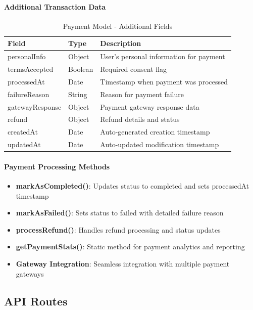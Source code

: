 \documentclass[12pt,a4paper]{article}
\begin{document}
\paragraph{Additional Transaction Data}
\begin{table}[H]
\centering
\small
\begin{tabular}{@{}lll@{}}
\toprule
\textbf{Field} & \textbf{Type} & \textbf{Description} \\
\midrule
personalInfo & Object & User's personal information for payment \\
termsAccepted & Boolean & Required consent flag \\
processedAt & Date & Timestamp when payment was processed \\
failureReason & String & Reason for payment failure \\
gatewayResponse & Object & Payment gateway response data \\
refund & Object & Refund details and status \\
createdAt & Date & Auto-generated creation timestamp \\
updatedAt & Date & Auto-updated modification timestamp \\
\bottomrule
\end{tabular}
\caption{Payment Model - Additional Fields}
\label{tab:payment-additional-schema}
\end{table}

\paragraph{Payment Processing Methods}
\begin{itemize}
\item \textbf{markAsCompleted()}: Updates status to completed and sets processedAt timestamp
\item \textbf{markAsFailed()}: Sets status to failed with detailed failure reason
\item \textbf{processRefund()}: Handles refund processing and status updates
\item \textbf{getPaymentStats()}: Static method for payment analytics and reporting
\item \textbf{Gateway Integration}: Seamless integration with multiple payment gateways
\end{itemize}

\subsection{API Routes}
\label{subsec:api-routes}
\end{document}
